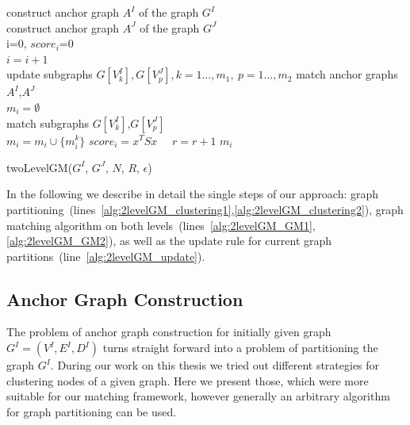 \begin{algorithm}[h]
	construct anchor graph $A^I$ of the graph $G^I$ \label{alg:2levelGM_clustering1}\\
	construct anchor graph $A^J$ of the graph $G^J$ \label{alg:2levelGM_clustering2}\\
	i=0, $score_i$=0\\
	{ $i=i+1$ \\
	  {update subgraphs $G[V^I_k],G[V^J_p],k=1\dots,m_1,\ p=1\dots,m_2$ \label{alg:2levelGM_update}}
	  match anchor graphs $A^I$,$A^J$ \label{alg:2levelGM_GM1} \\
	  $m_i=\emptyset$\\
	  {match subgraphs $G[V^I_k]$,$G[V^J_p]$ \label{alg:2levelGM_GM2}\\
	   $m_i=m_i\cup\{m^k_i\}$\hspace{55pt}
	  }
	  $score_i=x^TSx$\ \ 
	  {$r=r+1$}
	}
	\Return $m_i$
	\caption{twoLevelGM($G^I$, $G^J$, $N$, $R$, $\epsilon$)} \label{alg:2levelGM}
\end{algorithm}

In the following we describe in detail the single steps of our approach: %
graph partitioning~(lines~\ref{alg:2levelGM_clustering1},\ref{alg:2levelGM_clustering2}), graph matching algorithm on both levels~(lines~\ref{alg:2levelGM_GM1},\ref{alg:2levelGM_GM2}), as well as the update rule for current graph partitions~(line~\ref{alg:2levelGM_update}).
\subsection{Anchor Graph Construction} \label{subgraphInit}
The problem of anchor graph construction for initially given graph $G^I=(V^I,E^I,D^I)$ turns straight forward into a problem of partitioning the graph $G^I$. During our work on this thesis we tried out different strategies for clustering nodes of a given graph. Here we present those, which were more suitable for our matching framework, however generally an arbitrary algorithm for graph partitioning can be used.

